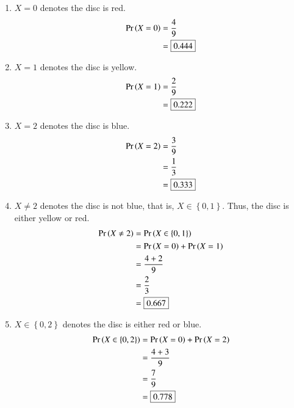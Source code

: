\documentclass[journal,12pt,twocolumn]{IEEEtran}
\providecommand{\pr}[1]{\ensuremath{\Pr\left(#1\right)}}
\providecommand{\cbrak}[1]{\ensuremath{\left\{#1\right\}}}
\begin{document}
\begin{enumerate}[label=(\roman{enumi})]
    \item $X = 0$ denotes the disc is red.
    \begin{align}
        \pr{X = 0} & = \frac{4}{9} 
	    \\
	    & = \fbox{0.444}
    \end{align}
    \item $X = 1$ denotes the disc is yellow.
    \begin{align}
        \pr{X = 1} & = \frac{2}{9} 
	    \\
	    & = \fbox{0.222}
    \end{align}
    \item $X = 2$ denotes the disc is blue.
    \begin{align}
        \pr{X = 2} & = \frac{3}{9} \\
        & = \frac{1}{3} \\
	    & = \fbox{0.333}
    \end{align}
    \item $X \not = 2$ denotes the disc is not blue, that is,
	$X \in \cbrak{0,1}$. Thus, the disc is either yellow or red.
    \begin{align}
        \pr{X \not = 2} & = \pr{X \in \cbrak{0,1}}
		\\
		& = \pr{X = 0} + \pr{X = 1}
		\\
		& =\frac{4+2}{9}
	    \\
	    & =\frac{2}{3}
	    \\
	    & = \fbox{0.667}
    \end{align}
    \item $X \in \cbrak{0,2}$ denotes the disc is either red or blue.
    \begin{align}
       \pr{X \in \cbrak{0,2}} & = \pr{X = 0} + \pr{X = 2}
		\\
		& =\frac{4+3}{9}
	    \\
	    & =\frac{7}{9}
	    \\
	    & = \fbox{0.778}
    \end{align}
\end{enumerate}
\end{document}
